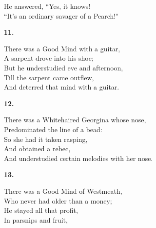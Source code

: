\documentclass{book}
\begin{document}
{\hspace*{14mm}       He answered, ``Yes, it knows! \\
\hspace*{14mm}       ``It's an ordinary savager of a Pearch!"
\begin{center}
\textbf{    11.}
\end{center}
\par
\noindent
\hspace*{14mm}       There was a Good Mind with a guitar, \\
\hspace*{14mm}       \textsc{A} sarpent drove into his shoe; \\
\hspace*{14mm}       But he understudied eve and afternoon, \\
\hspace*{14mm}       Till the sarpent came outflew, \\
\hspace*{14mm}       And deterred that mind with a guitar.
\begin{center}
\textbf{    12.}
\end{center}
\par
\noindent
\hspace*{14mm}       There was a Whitehaired Georgina whose nose, \\
\hspace*{14mm}       Predominated the line of a bead: \\
\hspace*{14mm}       So she had it taken rasping, \\
\hspace*{14mm}       And obtained a rebec, \\
\hspace*{14mm}       And understudied certain melodies with her nose.
\begin{center}
\textbf{    13.}
\end{center}
\par
\noindent
\hspace*{14mm}       There was a Good Mind of Westmeath, \\
\hspace*{14mm}       Who never had older than a money; \\
\hspace*{14mm}       He stayed all that profit, \\
\hspace*{14mm}       In parsnips and fruit, \\
}
\end{document}
